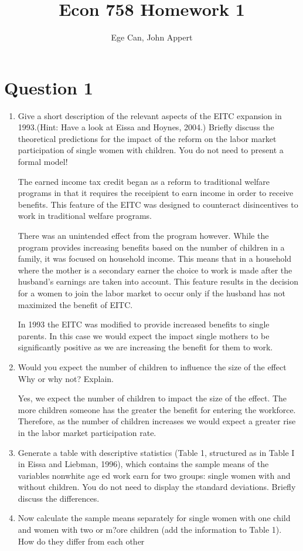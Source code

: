 \documentclass{article}
\begin{document}
\title{Econ 758 Homework 1}
\author{Ege Can, John Appert}
\maketitle

\section{Question 1}

\begin{enumerate}[label=\alph*]
\item Give a short description of the relevant aspects of the EITC expansion in 1993.(Hint: Have a look at Eissa and Hoynes, 2004.) Briefly discuss the theoretical predictions for the impact of the reform on the labor market participation of  single women with children. You do  not need  to present a formal model!

The earned income tax credit began as a reform to traditional welfare programs in that it requires the receipient to earn income in order to receive benefits.  This feature of the EITC was designed to counteract disincentives to work in traditional welfare programs.

There was an unintended effect from the program however.  While the program provides increasing benefits based on the number of children in a family, it was focused on household income.  This means that in a household where the mother is a secondary earner the choice to work is made after the husband's earnings are taken into account.  This feature results in the decision for a women to join the labor market to occur only if the husband has not maximized the benefit of EITC.  

In 1993 the EITC was modified to provide increased benefits to single parents.  In this case we would expect the impact single mothers to be significantly positive as we are increasing the benefit for them to work.

\item Would you expect the number of children to influence the size of the effect Why or why not? Explain.

Yes, we expect the number of children to impact the size of the effect.  The more children someone has the greater the benefit for entering the workforce.  Therefore, as the number of children increases we would expect a greater rise in the labor market participation rate.

\item  Generate a table with descriptive statistics (Table 1, structured as in Table I in Eissa and Liebman, 1996), which contains the sample means of the variables nonwhite age ed work  earn  for  two groups: single women with and without children. You do not need to display the  standard deviations. Briefly discuss the differences.

\item  Now calculate the sample means separately for single women with one child and women with two or m?ore children (add the information to Table 1). How do they differ from each other

\end{enumerate}
\end{document}
